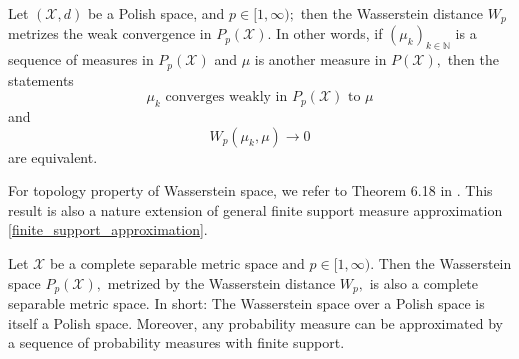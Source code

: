 \begin{thm}
	\label{thm:Wp_metrizes_weak_convergence}
	Let \( ( \mathcal { X } , d ) \) be a Polish space, and \( p \in [ 1 , \infty ) ; \) then the Wasserstein distance \( W _ { p } \) metrizes the weak convergence in \( P _ { p } ( \mathcal { X } ) . \) In other words, if \( \left( \mu _ { k } \right) _ { k \in \mathbb { N } } \) is a sequence of measures in \( P _ { p } ( \mathcal { X } ) \) and \( \mu \) is another measure in \( P ( \mathcal { X } ) , \) then the statements
	\[ \mu _ { k } \text { converges weakly in } P _ { p } ( \mathcal { X } ) \text { to } \mu \]
	and
	\[ W _ { p } \left( \mu _ { k } , \mu \right) \longrightarrow 0 \]
	are equivalent.
\end{thm}

For topology property of Wasserstein space, we refer to Theorem 6.18 in \cite{villani2008optimal}. This result is also a nature extension of general finite support measure approximation \cref{finite_support_approximation}.
\begin{thm}
	\label{topology_Wasserstein}
	Let \( \mathcal { X } \) be a complete separable metric space and \( p \in [ 1 , \infty ) \). Then the Wasserstein space \( P _ { p } ( \mathcal { X } ) , \) metrized by the Wasserstein distance \( W _ { p } , \) is also a complete separable metric space. In short: The Wasserstein space over a Polish space is itself a Polish space. Moreover, any probability measure can be approximated by a sequence of probability measures with finite support.
\end{thm}

